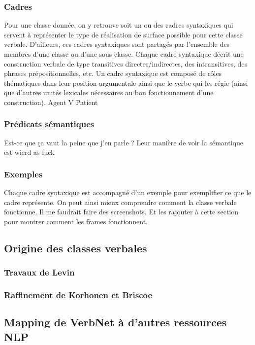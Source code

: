 \documentclass[12pt,maitrise,frenchb,natbib,twoside,initial]{dms}
\numberwithin{equation}{section}
\numberwithin{table}{chapter}
\numberwithin{figure}{chapter}
\begin{document}
\subsubsection{Cadres}

Pour une classe donnée, on y retrouve soit un ou des cadres syntaxiques qui servent à représenter le type de réalisation de surface possible pour cette classe verbale. D'ailleurs, ces cadres syntaxiques sont partagés par l'ensemble des membres d'une classe ou d'une sous-classe. Chaque cadre syntaxique décrit une construction verbale de type transitives directes/indirectes, des intransitives, des phrases prépositionnelles, etc. Un cadre syntaxique est composé de rôles thématiques dans leur position argumentale ainsi que le verbe qui les régie (ainsi que d'autres unités lexicales nécessaires au bon fonctionnement d'une construction).
Agent V Patient

\subsubsection{Prédicats sémantiques}

Est-ce que ça vaut la peine que j'en parle ? Leur manière de voir la sémantique est wierd as fuck

\subsubsection{Exemples}

Chaque cadre syntaxique est accompagné d'un exemple pour exemplifier ce que le cadre représente. On peut ainsi mieux comprendre comment la classe verbale fonctionne. Il me faudrait faire des screenshots. Et les rajouter à cette section pour montrer comment les frames fonctionnent.

\subsection{Origine des classes verbales}

\subsubsection {Travaux de Levin}

\subsubsection {Raffinement de Korhonen et Briscoe}

\subsection {Mapping de VerbNet à d'autres ressources NLP} 
\end{document}
